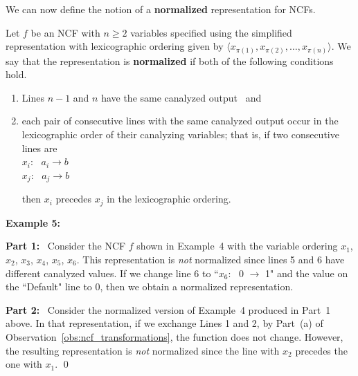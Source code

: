 
\medskip
We can now define the notion of a \textbf{normalized} 
representation for NCFs.

\begin{definition}
\label{def:normalized}
Let $f$ be an NCF with $n \geq 2$ variables specified using
the simplified representation with 
lexicographic ordering given by  
$\langle x_{\pi(1)}, x_{\pi(2)}, \ldots, x_{\pi(n)}\rangle$.
We say that the representation is {\bf normalized} if
both of the following conditions hold.
\begin{enumerate}
  \item Lines $n-1$ and $n$ have the same canalyzed output ~and
  \item each pair of consecutive lines
        with the same canalyzed output occur in the lexicographic order 
        of their canalyzing variables; that is, if two consecutive lines are \\
\noindent
\hspace*{1.1in} $x_i$:~ $a_i \longrightarrow b$ \\
\hspace*{1.1in} $x_j$:~ $a_j \longrightarrow b$

\noindent
then $x_i$ precedes $x_j$ in the lexicographic ordering.
\end{enumerate}
\end{definition}

\noindent
\textbf{Example 5:}~ 

\medskip
\noindent
\textbf{Part 1:}~
Consider the NCF $f$ shown in Example~4 with
the variable ordering $x_1$, $x_2$, $x_3$, $x_4$, $x_5$, $x_6$.
This representation is \emph{not} normalized since lines 5 and 6
have different canalyzed values.
If we change line 6 to ``$x_6$:~ 0 $\longrightarrow$ 1" and the
value on the ``Default" line to 0, then we obtain 
a normalized representation. 

\medskip
\noindent
\textbf{Part 2:}~ Consider the normalized version of Example~4 
produced in Part~1 above. 
In that representation, if we exchange Lines 1 and 2, 
by Part~(a) of Observation~\ref{obs:ncf_transformations},
the function does not change. 
However, the resulting representation is \emph{not} normalized
since the line with $x_2$ precedes the one 
with $x_1$. \qed

